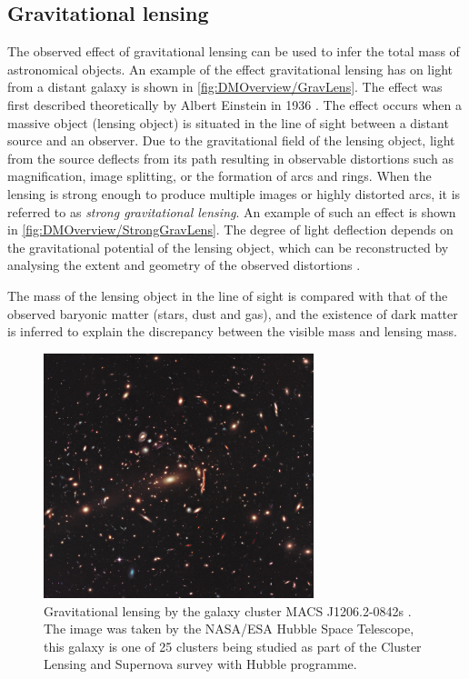 \subsection{Gravitational lensing}\label{sec:DMOverview/GravLens}
The observed effect of gravitational lensing can be used to infer the total mass of astronomical objects. An example of the effect gravitational lensing has on light from a distant galaxy is shown in \autoref{fig:DMOverview/GravLens}. The effect was first described theoretically by Albert Einstein in 1936 \cite{GravLens}. The effect occurs when a massive object (lensing object) is situated in the line of sight between a distant source and an observer. Due to the gravitational field of the lensing object, light from the source deflects from its path resulting in observable distortions such as magnification, image splitting, or the formation of arcs and rings.
When the lensing is strong enough to produce multiple images or highly distorted arcs, it is referred to as \textit{strong gravitational lensing}. An example of such an effect is shown in \autoref{fig:DMOverview/StrongGravLens}. The degree of light deflection depends on the gravitational potential of the lensing object, which can be reconstructed by analysing the extent and geometry of the observed distortions \cite{Young2016}.

The mass of the lensing object in the line of sight is compared with that of the observed baryonic matter (stars, dust and gas), and the existence of dark matter is inferred to explain the discrepancy between the visible mass and lensing mass. 
\begin{figure}[ht!]
	\centering
	\includegraphics[width=0.7\textwidth]{figures/DMOverview/GravLensIm.jpg}
	\caption[Gravitational lensing by the galaxy cluster MACS J1206.2-0842s.]{Gravitational lensing by the galaxy cluster MACS J1206.2-0842s \cite{GravLensPicture}. The image was taken by the NASA/ESA Hubble Space Telescope, this galaxy is one of 25 clusters being studied as part of the Cluster Lensing and Supernova survey with Hubble programme.}
	\label{fig:DMOverview/GravLens}
\end{figure}


